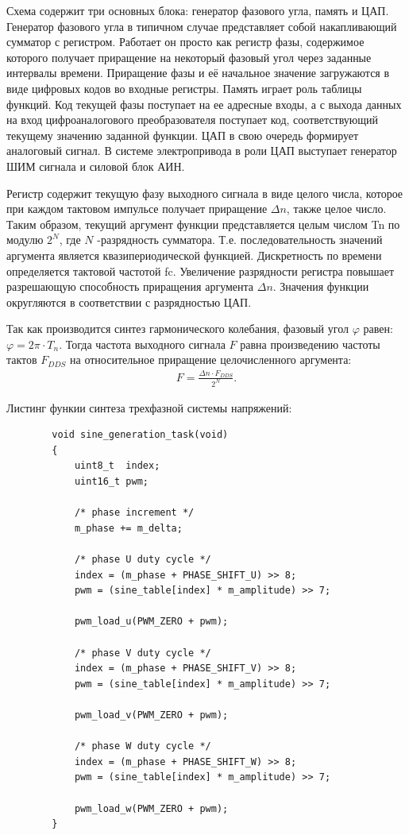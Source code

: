         Схема содержит три основных блока: генератор фазового угла, память и
        ЦАП. Генератор фазового угла в типичном случае представляет собой
        накапливающий сумматор с регистром. Работает он просто как регистр
        фазы, содержимое которого получает приращение на некоторый фазовый угол
        через заданные интервалы времени. Приращение фазы и её начальное
        значение загружаются в виде цифровых кодов во входные регистры. Память
        играет роль таблицы функций. Код текущей фазы поступает на ее адресные
        входы, а с выхода данных на вход цифроаналогового преобразователя
        поступает код, соответствующий текущему значению заданной функции.  ЦАП
        в свою очередь формирует аналоговый сигнал. В системе электропривода в
        роли ЦАП выступает генератор ШИМ сигнала и силовой блок АИН.

        Регистр содержит текущую фазу выходного сигнала в виде целого числа,
        которое при каждом тактовом импульсе получает приращение $\Delta n$,
        также целое число. Таким образом, текущий аргумент функции
        представляется целым числом Tn по модулю $2^N$, где $N$ -разрядность
        сумматора. Т.е.  последовательность значений аргумента является
        квазипериодической функцией. Дискретность по времени определяется
        тактовой частотой fc.  Увеличение разрядности регистра повышает
        разрешающую способность приращения аргумента $\Delta n$. Значения
        функции округляются в соответствии с разрядностью ЦАП.

        Так как производится синтез гармонического колебания, фазовый угол
        $\varphi$ равен: $\varphi = 2\pi \cdot T_n$. Тогда частота выходного
        сигнала $F$ равна произведению частоты тактов $F_{DDS}$ на относительное
        приращение целочисленного аргумента:
        \begin{gather*}
            F = \frac{\Delta n \cdot F_{DDS}}{2^N}.
        \end{gather*}

        Листинг функии синтеза трехфазной системы напряжений:
        \begin{verbatim}
        void sine_generation_task(void)
        {
            uint8_t  index;
            uint16_t pwm;

            /* phase increment */
            m_phase += m_delta;
         
            /* phase U duty cycle */
            index = (m_phase + PHASE_SHIFT_U) >> 8;
            pwm = (sine_table[index] * m_amplitude) >> 7;

            pwm_load_u(PWM_ZERO + pwm);

            /* phase V duty cycle */
            index = (m_phase + PHASE_SHIFT_V) >> 8;
            pwm = (sine_table[index] * m_amplitude) >> 7;

            pwm_load_v(PWM_ZERO + pwm);

            /* phase W duty cycle */
            index = (m_phase + PHASE_SHIFT_W) >> 8;
            pwm = (sine_table[index] * m_amplitude) >> 7;

            pwm_load_w(PWM_ZERO + pwm);
        }
        \end{verbatim}

